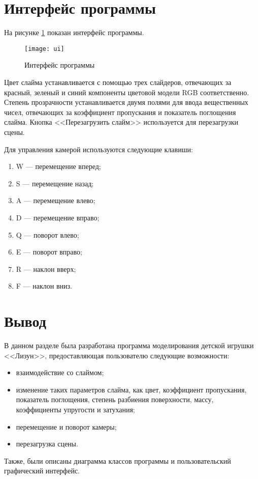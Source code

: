 \section{Интерфейс программы}

На рисунке \ref{ui} показан интерфейс программы.

\begin{figure}[h!]
	\centering
	\texttt{[image: ui]}
	\caption{Интерфейс программы}
	\label{ui}
\end{figure}

Цвет слайма устанавливается с помощью трех слайдеров, отвечающих за красный, зеленый и синий компоненты цветовой модели RGB соответственно. Степень прозрачности устанавливается двумя полями для ввода вещественных чисел, отвечающих за коэффициент пропускания и показатель поглощения слайма. Кнопка <<Перезагрузить слайм>> используется для перезагрузки сцены.

Для управления камерой используются следующие клавиши:

\begin{enumerate}
	\item W --- перемещение вперед;
	\item S --- перемещение назад;
	\item A --- перемещение влево;
	\item D --- перемещение вправо;
	\item Q --- поворот влево;
	\item E --- поворот вправо;
	\item R --- наклон вверх;
	\item F --- наклон вниз.
\end{enumerate}

\section*{Вывод}

В данном разделе была разработана программа моделирования детской игрушки <<Лизун>>, предоставляющая пользователю следующие возможности:

\begin{itemize}
	\item взаимодействие со слаймом;
	\item изменение таких параметров слайма, как цвет, коэффициент пропускания, показатель поглощения, степень разбиения поверхности, массу, коэффициенты упругости и затухания;
	\item перемещение и поворот камеры;
	\item перезагрузка сцены.
\end{itemize}

Также, были описаны диаграмма классов программы и пользовательский графический интерфейс.

\clearpage
